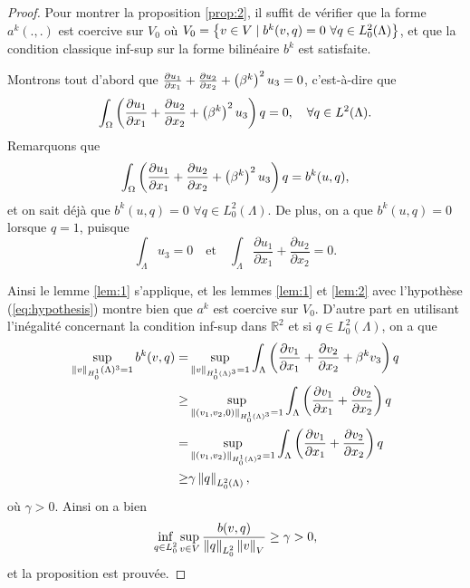 \begin{proof}
  Pour montrer la proposition \ref{prop:2}, il suffit de vérifier
  que la forme $a^k(.,.)$ est coercive sur $V_0$ où $V_0 = \left\{ v
    \in V\mid b^k(v, q) = 0\ \forall q \in
    L^2_0(\Lambda) \right\}$, et que la condition classique inf-sup sur la forme
  bilinéaire $b^k$ est satisfaite.

  Montrons tout d'abord que $\frac{\partial u_1}{\partial x_1} +
  \frac{\partial u_2}{\partial x_2} + \left( \beta^k \right)^2 u_3 = 0$,
  c'est-à-dire que
  \begin{equation}
    \int_\Omega\left( \frac{\partial u_1}{\partial x_1} +
  \frac{\partial u_2}{\partial x_2} + \left( \beta^k \right)^2 u_3 \right)q =
    0,\quad \forall q\in L^2(\Lambda).
  \end{equation}
  Remarquons que
  \begin{equation}
    \int_\Omega\left( \frac{\partial u_1}{\partial x_1} +
      \frac{\partial u_2}{\partial x_2} + \left( \beta^k \right)^2 u_3 \right)q =
    b^k(u, q),
  \end{equation}
  et on sait déjà que $b^k(u, q) = 0$ $\forall q \in
  L_0^2(\Lambda)$. De plus, on a que $b^k(u, q) = 0$ lorsque $q = 1$,
  puisque
  \begin{equation}
    \int_\Lambda u_3  = 0 \quad \text{et}\quad \int_\Lambda
    \frac{\partial u_1}{\partial x_1} + \frac{\partial u_2}{\partial
      x_2} = 0.
  \end{equation}

  Ainsi le lemme \ref{lem:1} s'applique, et les lemmes \ref{lem:1} et
  \ref{lem:2} avec l'hypothèse (\ref{eq:hypothesis}) montre bien que
  $a^k$ est coercive sur $V_0$. D'autre part en utilisant l'inégalité
  concernant la condition inf-sup dans $\mathbb R^2$ et si $q\in
  L^2_0(\Lambda)$, on a que
  \begin{align*}
    \sup_{\left\lVert v \right\rVert_{H^1_0}(\Lambda)^3 = 1} b^k(v,q) = &\sup_{\left\lVert v \right\rVert_{H^1_0(\Lambda)^3} = 1} \int_{\Lambda}\left( \frac{\partial v_1}{\partial x_1} + \frac{\partial v_2}{\partial x_2} + \beta^k v_3 \right)q\\
    \geq & \sup_{\left\lVert (v_1, v_2, 0) \right\rVert_{H^1_0(\Lambda)^3} =
      1}\int_{\Lambda}\left( \frac{\partial v_1}{\partial x_1} +
      \frac{\partial v_2}{\partial x_2} \right)q\\
    = & \sup_{\left\lVert (v_1, v_2) \right\rVert_{H^1_0(\Lambda)^2} = 1}\int_{\Lambda}\left( \frac{\partial v_1}{\partial x_1} + \frac{\partial v_2}{\partial x_2} \right)q\\
    \geq& \gamma \left\lVert q \right\rVert_{L^2_0(\Lambda)},
  \end{align*}
  où $\gamma > 0$. Ainsi on a bien
  \begin{equation*}
    \inf_{q\in L^2_0}\sup_{v\in V} \frac{b(v,
      q)}{\left\lVert q \right\rVert_{L^2_0}\left\lVert v \right\rVert_{V}} \geq \gamma > 0,
  \end{equation*}
  et la proposition est prouvée.
\end{proof}

